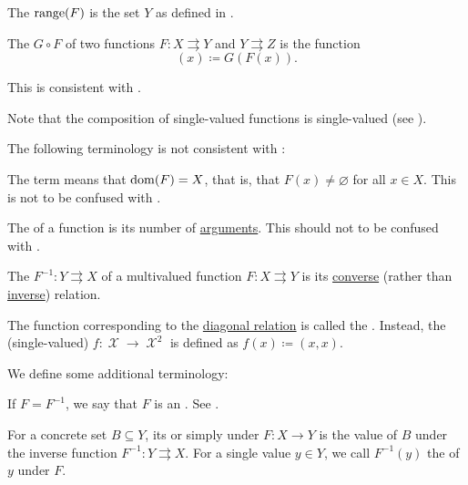\begin{definition}
\begin{thmenum}[resume=def:function]
     The  \( \operatorname{range}(F) \) is the set \( Y \) as defined in .

     The  \( G \circ F \) of two functions \( F: X \rightrightarrows Y \) and \( Y \rightrightarrows Z \) is the function
    \begin{equation*}
      [G \circ F](x) \coloneqq G(F(x)).
    \end{equation*}

    This is consistent with .

    Note that the composition of single-valued functions is single-valued (see ).
  \end{thmenum}

  The following terminology is not consistent with :
  \begin{thmenum}[resume=def:function]
     The term  means that \( \operatorname{dom}(F) = X \), that is, that \( F(x) \neq \varnothing \) for all \( x \in X \). This is not to be confused with .

     The  of a function is its number of \hyperref[def:function/arity]{arguments}. This should not to be confused with .

     The  \( F^{-1}: Y \rightrightarrows X \) of a multivalued function \( F: X \rightrightarrows Y \) is its \hyperref[def:binary_relation/converse]{converse} (rather than \hyperref[def:binary_relation/inverse]{inverse}) relation.

     The function corresponding to the \hyperref[def:binary_relation/diagonal]{diagonal relation} is called the . Instead, the (single-valued)  \( f: \mscrX \to \mscrX^2 \) is defined as \( f(x) \coloneqq (x, x) \).
  \end{thmenum}

  We define some additional terminology:
  \begin{thmenum}[resume=def:function]
     If \( F = F^{-1} \), we say that \( F \) is an . See .

     For a concrete set \( B \subseteq Y \), its  or simply  under \( F: X \to Y \) is the value of \( B \) under the inverse function \( F^{-1}: Y \rightrightarrows X \). For a single value \( y \in Y \), we call \( F^{-1}(y) \) the  of \( y \) under \( F \).


\end{thmenum}
\end{definition}
